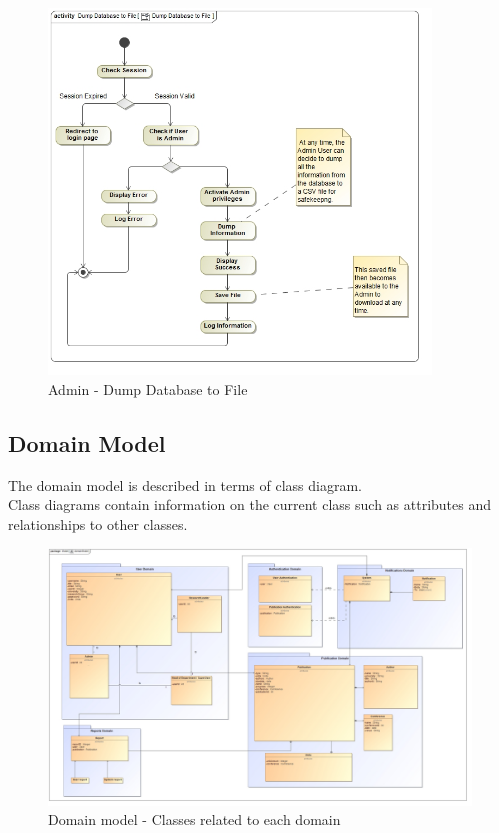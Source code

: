 \documentclass{article}
\begin{document}
			\begin{figure}[H]
				\includegraphics[width=4in, center]{../Diagrams/Process Specifications/act__Dump_Database_to_File__Dump_Database_to_File.jpg}
				\caption{Admin - Dump Database to File}
			\end{figure}
			
		\cleardoublepage
		\subsection{Domain Model}\label{subsec:domainmodel}
		The domain model is described in terms of class diagram.\\ Class diagrams contain information on the current class such as attributes and relationships to other classes.
		
			\begin{figure}[H]				
				\includegraphics[width=\linewidth]{../Diagrams/Domain Model/domainModel.jpg}
				\caption{ Domain model - Classes related to each domain }
			\end{figure}
			
\end{document}
